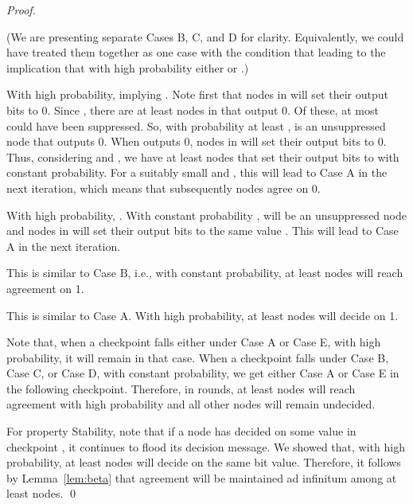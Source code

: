 \documentclass[leqno,11pt]{article}
\begin{document}
{\begin{proof}
\begin{description}
  (We are presenting separate Cases B, C, and D for clarity. Equivalently, we could have treated them together as one case with the condition that   leading to the implication that with high probability either  or .)

	
\item[Case B ():] With high
   probability,  implying  . Note first that nodes in  will set their output bits to 0.
   Since , there are at least  nodes
   in  that output 0. Of these, at most  could have been
   suppressed. So, with probability at least ,  is an
   unsuppressed node that outputs 0. When  outputs 0, nodes in 
   will set their output bits to 0. Thus, considering  and , we
   have at least  nodes that set their output bits to  with
   constant probability. 
For a suitably small  and , this will lead to
Case A in the next iteration, which means that subsequently nodes agree on 0.
	 
   \item[Case C ():]
     With high probability, . With constant probability
     ,  will be an unsuppressed node and nodes in  will
     set their output bits to the same value . This will  lead to 
     Case A in the next iteration. 

   \item[Case D ():] 
     This is similar to Case B, i.e., with constant probability, at least   nodes will reach agreement on 1.


   \item[Case E ():] This is similar to Case A.
     With high probability, at least  nodes will decide on 1. 

\end{description}
Note that, when a checkpoint falls either under Case A or Case E, with high
probability, it will remain in that case. When a checkpoint falls under Case B,
Case C, or Case D, with constant probability, we get either Case A or Case E in
the following checkpoint. Therefore, in  rounds, at least
 nodes will reach agreement with high probability and all other
nodes will remain undecided.

For property Stability, note that if a node has decided on some value 
in checkpoint , it continues to flood its decision message. We showed that, with high probability, at least
 nodes will decide on the same bit value. Therefore, it follows by
Lemma~\ref{lem:beta} that agreement will be maintained  ad infinitum among at
least  nodes. \qed
\end{proof}
}
\end{document}
